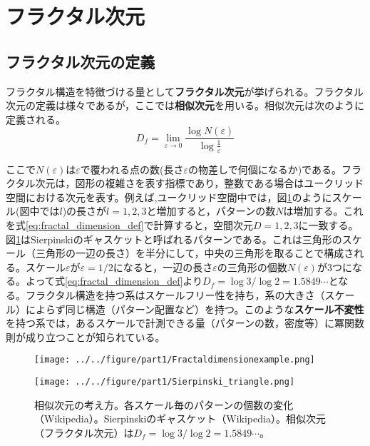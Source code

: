 \documentclass[autodetect-engine,dvi=dvipdfmx,a4paper,ja=standard,oneside,openany,11pt,draft]{bxjsbook}
\begin{document}
\section{フラクタル次元}
\label{sec:fractal_dimension}
\subsection{フラクタル次元の定義}
フラクタル構造を特徴づける量として\textbf{フラクタル次元}が挙げられる。フラクタル次元の定義は様々であるが，ここでは\textbf{相似次元}を用いる。相似次元は次のように定義される。
\begin{equation}
  D_f=\lim_{\varepsilon \to 0}\frac{\log N(\varepsilon)}{\log \frac{1}{\varepsilon}}
  \label{eq:fractal_dimension_def}
\end{equation}

ここで$N(\varepsilon)$は$\varepsilon$で覆われる点の数(長さ$\varepsilon$の物差しで何個になるか)である。フラクタル次元は，図形の複雑さを表す指標であり，整数である場合はユークリッド空間における次元を表す。例えば,ユークリッド空間中では，図\ref{fig:fractal_stracture}のようにスケール(図中では$l$)の長さが$l=1,2,3$と増加すると，パターンの数$N$は増加する。これを式\eqref{eq:fractal_dimension_def}で計算すると，空間次元$D=1,2,3$に一致する。図\ref{fig:fractal_stracture}はSierpinskiのギャスケットと呼ばれるパターンである。これは三角形のスケール（三角形の一辺の長さ）を半分にして，中央の三角形を取ることで構成される。スケール$\varepsilon$が$\varepsilon=1/2$になると，一辺の長さ$\varepsilon$の三角形の個数$N(\varepsilon)$が3つになる。よって式\eqref{eq:fractal_dimension_def}より$D_f=\log 3/\log 2=1.5849\cdots$となる。フラクタル構造を持つ系はスケールフリー性を持ち，系の大きさ（スケール）によらず同じ構造（パターン配置など）を持つ。このような\textbf{スケール不変性}を持つ系では，あるスケールで計測できる量（パターンの数，密度等）に冪関数則が成り立つことが知られている。

\begin{figure}[htbp]
  \begin{minipage}{0.45\textwidth}
    \centering
    \subcaption{}
    \texttt{[image: ../../figure/part1/Fractaldimensionexample.png]}
    \label{fig:相似次元の考え方}
  \end{minipage}
  \begin{minipage}{0.45\textwidth}
    \centering
    \subcaption{}
    \texttt{[image: ../../figure/part1/Sierpinski\_triangle.png]}
    \label{fig:シェルピンスキーのギャスケット}
  \end{minipage}
  \caption{相似次元の考え方。各スケール毎のパターンの個数の変化（Wikipedia）。Sierpinskiのギャスケット（Wikipedia）。相似次元（フラクタル次元）は$D_f=\log 3/\log 2=1.5849\cdots$。}
  \label{fig:fractal_stracture}
\end{figure}
\end{document}
